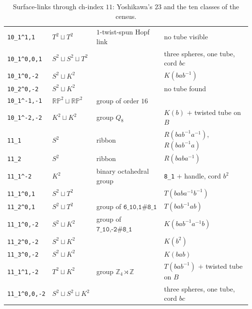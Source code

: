 \documentclass[11pt]{amsart}
\newcommand{\RP}{\mathbb{RP}^2}
\newcommand{\Z}{\mathbb{Z}}
\newcommand{\lab}[1]{\texttt{#1}}
\newcommand{\inv}{^{-1}}
\theoremstyle{plain}
\theoremstyle{remark}
\begin{document}
\begin{table}[ht]
\begin{tabular}{@{}llll@{}}
\lab{10\_1\^{}1,1} & $T^2\sqcup T^2$ & $1$-twist-spun Hopf link & no tube visible \\
\lab{10\_1\^{}0,0,1} & $S^2\sqcup S^2\sqcup T^2$ & & three spheres, one tube, cord $bc$ \\
\lab{10\_1\^{}0,-2} & $S^2\sqcup K^2$ & & $K(bab\inv)$ \\
\lab{10\_2\^{}0,-2} & $S^2\sqcup K^2$ & & no tube found \\
\lab{10\_1\^{}-1,-1} & $\RP\sqcup\RP$ & group of order $16$ & \\
\lab{10\_1\^{}-2,-2} & $K^2\sqcup K^2$ & group $Q_8$ & $K(b)$ $+$ twisted tube on $B$ \\
\midrule
\lab{11\_1} & $S^2$ & ribbon & $R(bab\inv a\inv)$, $R(bab\inv a)$ \\
\lab{11\_2} & $S^2$ & ribbon & $R(baba\inv)$ \\
\lab{11\_1\^{}-2} & $K^2$ & binary octahedral group & \lab{8\_1} $+$ handle, cord $b^2$ \\
\lab{11\_1\^{}0,1} & $S^2\sqcup T^2$ & & $T(baba\inv b\inv)$ \\
\lab{11\_2\^{}0,1} & $S^2\sqcup T^2$ & group of $\lab{6\_1\^{}0,1}\#\lab{8\_1}$ & $T(bab\inv ab)$ \\
\lab{11\_1\^{}0,-2} & $S^2\sqcup K^2$ & group of $\lab{7\_1\^{}0,-2}\#\lab{8\_1}$ & $K(bab\inv a\inv b)$ \\
\lab{11\_2\^{}0,-2} & $S^2\sqcup K^2$ & & $K(b^2)$ \\
\lab{11\_3\^{}0,-2} & $S^2\sqcup K^2$ & & $K(bab)$ \\
\lab{11\_1\^{}1,-2} & $T^2\sqcup K^2$ & group $\Z_4\rtimes\Z$ & $T(bab\inv)$ $+$ twisted tube on $B$ \\
\lab{11\_1\^{}0,0,-2} & $S^2\sqcup S^2\sqcup K^2$ & & three spheres, one tube, cord $bc$ \\
\bottomrule
\end{tabular}
\caption{Surface-links through ch-index $11$: Yoshikawa's $23$ and the ten classes of the census.}
\label{tab:all}
\end{table}
\end{document}
